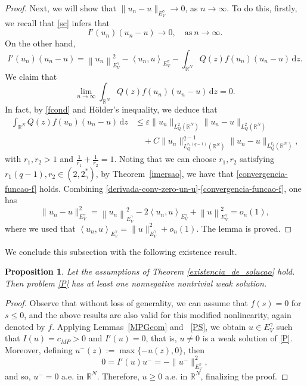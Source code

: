 \documentclass[12pt]{amsart}
\newtheorem{proposition}[theorem]{Proposition}
\begin{document}
\begin{proof}
Next, we will show that $\|u_n-u\|_{E_V^\gamma} \to 0$, as $n\to \infty$. To do this, firstly, we recall that \eqref{sc} infers that
	\begin{equation}\label{derivada-conv-zero-un-u}
		I'(u_n)(u_n-u) \rightarrow0,\quad \mbox{as}\ n\rightarrow\infty.
	\end{equation}
On the other hand,
	\begin{equation}\label{derivada-conv-zero}
		I'(u_n)(u_n-u) = \left\|u_n\right\|_{E_V^\gamma}^2-\left\langle u_n, u\right\rangle_{E_V^\gamma} - \int_{\mathbb{R}^N} Q(z) f(u_n)\left(u_n-u\right)\,\mathrm{d}z.
	\end{equation}
We claim that
	\begin{equation}\label{convergencia-funcao-f}
		\lim_{n \to \infty} \int_{\mathbb{R}^N} Q(z) f(u_n)\left(u_n-u\right)\,\mathrm{d}z  = 0.
	\end{equation}
In fact, by \eqref{fcond} and H\"older's inequality, we deduce that
	$$
	\begin{aligned}
		\int_{\mathbb{R}^N} Q(z) f(u_n)\left(u_n-u\right)\,\mathrm{d}z &\leq \varepsilon\|u_n\|_{L_Q^2(\mathbb{R}^N)} \|u_n - u\|_{L_Q^2(\mathbb{R}^N)} 
		\\
		&\quad+ C \|u_n\|_{L_Q^{r_1(q-1)}(\mathbb{R}^N)}^{q-1} \|u_n - u\|_{L_Q^{r_2}(\mathbb{R}^N)}, 
	\end{aligned}
	$$
	with $r_1,r_2>1$ and $\frac{1}{r_1} + \frac{1}{r_2}=1$. Noting that we can choose $r_1,r_2$ satisfying $r_1(q-1),r_2 \in (2,2_\gamma^*)$, by Theorem~\ref{imersao}, we have that \eqref{convergencia-funcao-f} holds. Combining \eqref{derivada-conv-zero-un-u}-\eqref{convergencia-funcao-f}, one has 
	$$
	\|u_n-u\|_{E_V^\gamma}^2 = \left\|u_n\right\|_{E_V^\gamma}^2-2\left\langle u_n, u\right\rangle_{E_V^\gamma} + \left\|u\right\|_{E_V^\gamma}^2 = o_n(1),
	$$
	where we used that $\left\langle u_n, u\right\rangle_{E_V^\gamma} = \|u\|_{E_V^\gamma}^2+o_n(1)$. The lemma is proved.	
\end{proof}

    We conclude this subsection with the following existence result.



    \begin{proposition}\label{existencia-solucao}
	Let the assumptions of Theorem \ref{existencia_de_solucao} hold. Then problem \eqref{P} has at
	least one nonnegative nontrivial weak solution.
\end{proposition}


\begin{proof}
	Observe that without loss of generality, we can assume that $f(s)=0$ for $s\leq0$, and the above results are also valid for this modified nonlinearity, again denoted by $f$. Applying Lemmas~\ref{MPGeom} and ~\ref{PS}, we obtain $u \in E_V^\gamma$ such that $I(u)=c_{MP}>0$ and $I'(u)=0$, that is, $u\neq0$ is a weak solution of \eqref{P}. Moreover, defining $u^-(z):=\max\{-u(z),0\}$, then
	$$
	0 = I'(u)u^- = -\|u^-\|_{E_V^\gamma}^2,
	$$
	and so, $u^- =0$ a.e. in $\mathbb{R}^N$. Therefore, $u \geq 0$ a.e. in $\mathbb{R}^N$, finalizing the proof.
\end{proof}
\end{document}
